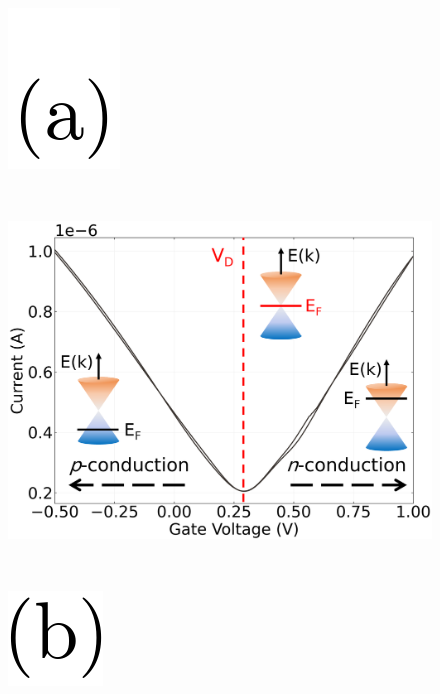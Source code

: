 \documentclass[
  letterpaper,
  DIV=11,
  numbers=noendperiod]{scrartcl}
\begin{document}
\begin{figure}

\begin{minipage}{0.03\linewidth}
\includegraphics{figures/(a).png}\end{minipage}%
%
\begin{minipage}{0.01\linewidth}
~\end{minipage}%
%
\begin{minipage}{0.45\linewidth}
\includegraphics{figures/ch2/Graphene_transfer_1.png}\end{minipage}%
%
\begin{minipage}{0.01\linewidth}
~\end{minipage}%
%
\begin{minipage}{0.03\linewidth}
\includegraphics{figures/(b).png}\end{minipage}%
%
\begin{minipage}{0.01\linewidth}

\end{minipage}
\end{figure}
\end{document}
